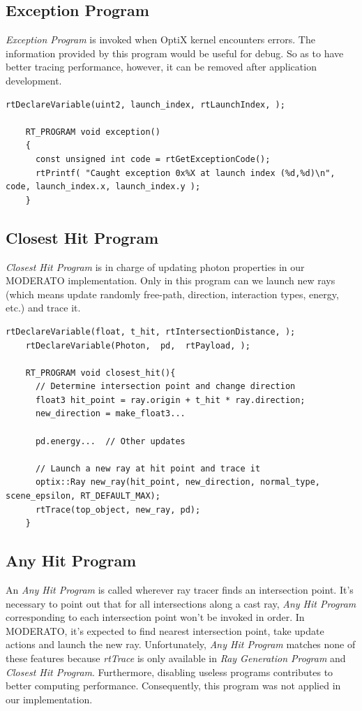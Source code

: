 \subsection{Exception Program}
\textit{Exception Program} is invoked when OptiX kernel encounters errors. The information provided by this program would be useful for debug. So as to have better tracing performance, however, it can be removed after application development.
\begin{lstlisting}[mathescape]
    rtDeclareVariable(uint2, launch_index, rtLaunchIndex, );
    
    RT_PROGRAM void exception()
    {
      const unsigned int code = rtGetExceptionCode();
      rtPrintf( "Caught exception 0x%X at launch index (%d,%d)\n", code, launch_index.x, launch_index.y );
    }
\end{lstlisting}


\subsection{Closest Hit Program}
\textit{Closest Hit Program} is in charge of updating photon properties in our MODERATO implementation. Only in this program can we launch new rays (which means update randomly free-path, direction, interaction types, energy, etc.) and trace it.
\begin{lstlisting}[mathescape]
    rtDeclareVariable(float, t_hit,	rtIntersectionDistance, );
    rtDeclareVariable(Photon,  pd,	rtPayload, );
    
    RT_PROGRAM void closest_hit(){
      // Determine intersection point and change direction
      float3 hit_point = ray.origin + t_hit * ray.direction;
      new_direction = make_float3...

      pd.energy...  // Other updates

      // Launch a new ray at hit point and trace it
      optix::Ray new_ray(hit_point, new_direction, normal_type, scene_epsilon, RT_DEFAULT_MAX);
      rtTrace(top_object, new_ray, pd);
    }
\end{lstlisting}


\subsection{Any Hit Program}
An \textit{Any Hit Program} is called wherever ray tracer finds an intersection point. It's necessary to point out that for all intersections along a cast ray, \textit{Any Hit Program} corresponding to each intersection point won't be invoked in order. In MODERATO, it's expected to find nearest intersection point, take update actions and launch the new ray. Unfortunately, \textit{Any Hit Program} matches none of these features because \textit{rtTrace} is only available in \textit{Ray Generation Program} and \textit{Closest Hit Program}. Furthermore, disabling useless programs contributes to better computing performance. Consequently, this program was not applied in our implementation.

